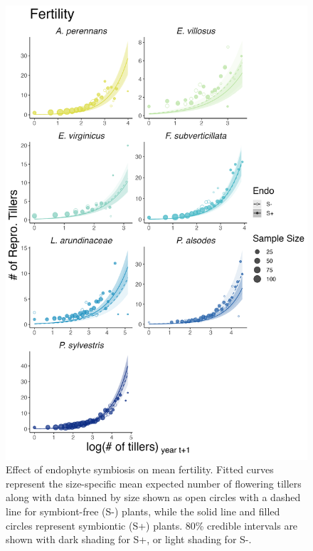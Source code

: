 \documentclass[9pt,twoside,lineno]{pnas-new}
\begin{document}
\begin{figure}
	\centering
	\includegraphics[width=.6\linewidth]{fert_meanplot.png}
	\caption{Effect of endophyte symbiosis on mean fertility. Fitted curves represent the size-specific mean expected number of flowering tillers along with data binned by size shown as open circles with a dashed line for symbiont-free (S-) plants, while the solid line and filled circles represent symbiontic (S+) plants. 80\% credible intervals are shown with dark shading for  S+, or light shading for S-.}
\end{figure}
\end{document}
